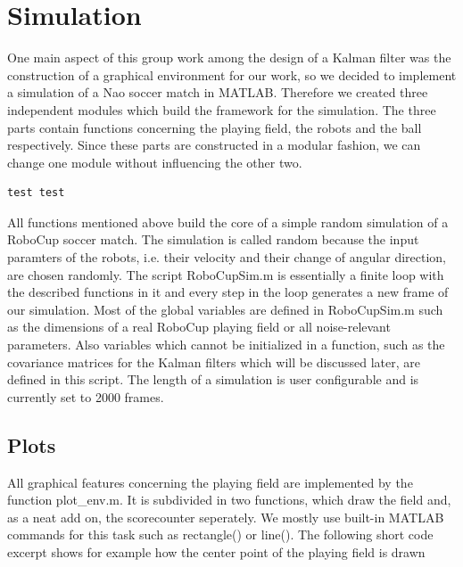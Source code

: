 
\chapter{Simulation}

One main aspect of this group work among the design of a Kalman filter was the construction of a graphical environment for our work, so we decided to implement a simulation of a Nao soccer match in MATLAB. Therefore we created three independent modules which build the framework for the simulation. The three parts contain functions concerning the playing field, the robots and the ball respectively. Since these parts are constructed in a modular fashion, we can change one module without influencing the other two.

\begin{verbatim}
test test
\end{verbatim}

All functions mentioned above build the core of a simple random simulation of a RoboCup soccer match. The simulation is called random because the input paramters of the robots, i.e. their velocity and their change of angular direction, are chosen randomly. The script {\selectfont RoboCupSim.m} is essentially a finite loop with the described functions in it and every step in the loop generates a new frame of our simulation. Most of the global variables are defined in {\selectfont RoboCupSim.m} such as the dimensions of a real RoboCup playing field or all noise-relevant parameters. Also variables which cannot be initialized in a function, such as the covariance matrices for the Kalman filters which will be discussed later, are defined in this script. The length of a simulation is user configurable and is currently set to 2000 frames.


\section{Plots}

All graphical features concerning the playing field are implemented by the function {\selectfont plot\_env.m}. It is subdivided in two functions, which draw the field and, as a neat add on, the scorecounter seperately. We mostly use built-in MATLAB commands for this task such as {\selectfont rectangle()} or {\selectfont line()}. The following short code excerpt shows for example how the center point of the playing field is drawn

